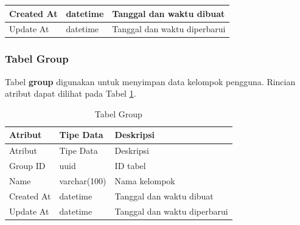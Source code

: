 \begin{longtable}{|p{2cm}|p{2.5cm}|p{4.5cm}|}
    Created At & datetime & Tanggal dan waktu dibuat \\ \hline
    Update At & datetime & Tanggal dan waktu diperbarui \\ \hline
\end{longtable}

\subsubsection{Tabel Group}
\par Tabel \textbf{group} digunakan untuk menyimpan data kelompok pengguna. Rincian atribut dapat dilihat pada Tabel \ref{tabel_group}.
\begin{longtable}{|p{2cm}|p{2.5cm}|p{4.5cm}|}
	\caption{Tabel Group} \label{tabel_group} \\ \hline
    \rowcolor{lightgray} {Atribut} & {Tipe Data} & {Deskripsi} \\ \hline
    \endfirsthead
    \hline
    \rowcolor{lightgray} {Atribut} & {Tipe Data} & {Deskripsi} \\ \hline
    \endhead
    Group ID & uuid & ID tabel \\ \hline
    Name & varchar(100) & Nama kelompok \\ \hline
    Created At & datetime & Tanggal dan waktu dibuat \\ \hline
    Update At & datetime & Tanggal dan waktu diperbarui \\ \hline
\end{longtable}

